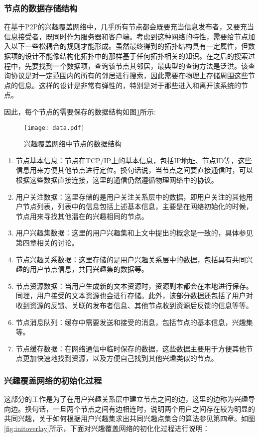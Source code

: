 \subsubsection{节点的数据存储结构}
在基于P2P的兴趣覆盖网络中，几乎所有节点都会既要充当信息发布者，又要充当信息接受者，既同时作为服务器和客户端。考虑到这种网络的特性，需要给节点加入以下一些松耦合的规则才能形成。虽然最终得到的拓扑结构具有一定属性，但数据项的设计不能像结构化拓扑中的那样基于任何拓扑相关的知识。在之后的搜索过程中，先要找到一个数据项，查询该节点其邻居，最典型的查询方法是泛洪。该查询协议是对一定范围内的所有的邻居进行搜索，因此需要在物理上存储周围这些节点的信息。这样的设计是非常有弹性的，特别是对于那些进入和离开该系统的节点。

因此，每个节点的需要保存的数据结构如图\ref{fig:data}所示:
\begin{figure}[!ht]
\centering
\texttt{[image: data.pdf]}
\caption{兴趣覆盖网络中节点的数据结构}
\label{fig:data}
\end{figure}

\begin{enumerate}
  \item 节点基本信息：节点在TCP/IP上的基本信息，包括IP地址、节点ID等，这些信息用来方便其他节点进行定位。换句话说，当节点之间要直接通信时，可以根据这些数据直接连接，这里的通信仍然遵循物理网络中的协议。
  \item 用户关注数据：这里存储的是用户关注关系层中的数据，即用户关注的其他用户节点列表，列表中的信息包括上述基本信息，主要是在网络初始化的时候，节点用来寻找其他潜在的兴趣相同的节点。
  \item 用户兴趣集数据：这里的用户兴趣集和上文中提出的概念是一致的，具体参见第四章相关的讨论。
  \item 节点兴趣关系数据：这里存储的是用户兴趣关系层中的数据，包括具有共同兴趣的用户节点信息，共同兴趣集的数据等。
  \item 节点资源数据：当用户生成新的文本资源时，资源副本都会在本地进行保存。同理，用户接受的文本资源也会进行存储。此外，该部分数据还包括了用户对收到资源的反馈、关联的发布者信息、其他节点收到资源后反馈的信息等等。
  \item 节点消息队列：缓存中需要发送和接受的消息，包括节点的基本信息，兴趣集等。
  \item 节点缓存数据：在网络通信中临时保存的数据，这些数据主要用于方便其他节点更加快速地找到资源，以及方便自己找到其他兴趣类似的节点。
\end{enumerate}

\subsubsection{兴趣覆盖网络的初始化过程}
这部分的工作是为了在用户兴趣关系层中建立节点之间的边，这里的边称为兴趣导向边。换句话，一旦两个节点之间有边相连时，说明两个用户之间存在较为明显的共同兴趣，关于如何根据用户兴趣集求出共同兴趣点集合的算法参见第四章。如图\ref{fig:initoverlay}所示，下面对兴趣覆盖网络的初化化过程进行说明：

